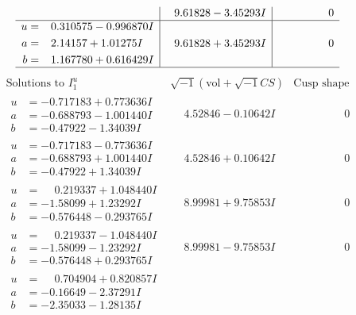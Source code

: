 \documentclass[1p]{elsarticle_modified}
\theoremstyle{definition}
\newcommand{\I}{\sqrt{-1}}
\begin{document}
$$\begin{array}{c|c|c}
 & \phantom{-}9.61828 - 3.45293 I & \phantom{-0.000000 } 0 \\ \hline\begin{aligned}
u &= \phantom{-}0.310575 - 0.996870 I \\
a &= \phantom{-}2.14157 + 1.01275 I \\
b &= \phantom{-}1.167780 + 0.616429 I\end{aligned}
 & \phantom{-}9.61828 + 3.45293 I & \phantom{-0.000000 } 0\\
 \hline 
 \end{array}$$\newpage$$\begin{array}{c|c|c}  
\text{Solutions to }I^u_{1}& \I (\text{vol} + \sqrt{-1}CS) & \text{Cusp shape}\\
 \hline 
\begin{aligned}
u &= -0.717183 + 0.773636 I \\
a &= -0.688793 - 1.001440 I \\
b &= -0.47922 - 1.34039 I\end{aligned}
 & \phantom{-}4.52846 - 0.10642 I & \phantom{-0.000000 } 0 \\ \hline\begin{aligned}
u &= -0.717183 - 0.773636 I \\
a &= -0.688793 + 1.001440 I \\
b &= -0.47922 + 1.34039 I\end{aligned}
 & \phantom{-}4.52846 + 0.10642 I & \phantom{-0.000000 } 0 \\ \hline\begin{aligned}
u &= \phantom{-}0.219337 + 1.048440 I \\
a &= -1.58099 + 1.23292 I \\
b &= -0.576448 - 0.293765 I\end{aligned}
 & \phantom{-}8.99981 + 9.75853 I & \phantom{-0.000000 } 0 \\ \hline\begin{aligned}
u &= \phantom{-}0.219337 - 1.048440 I \\
a &= -1.58099 - 1.23292 I \\
b &= -0.576448 + 0.293765 I\end{aligned}
 & \phantom{-}8.99981 - 9.75853 I & \phantom{-0.000000 } 0 \\ \hline\begin{aligned}
u &= \phantom{-}0.704904 + 0.820857 I \\
a &= -0.16649 - 2.37291 I \\
b &= -2.35033 - 1.28135 I\end{aligned}

\end{array}$$
\end{document}
